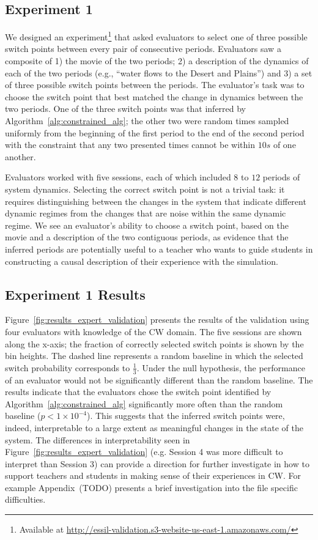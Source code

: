 \subsection{Experiment 1}\label{sec:experiment1-empirical-validation}

We designed an experiment\footnote{Available at \url{http://essil-validation.s3-website-us-east-1.amazonaws.com/}} that asked evaluators to select one of three possible switch points between every pair of consecutive periods. Evaluators saw a composite of 1) the movie of the two periods; 2) a description of the dynamics of each of the two periods (e.g., ``water flows to the Desert and Plains'') and 3) a set of three possible switch points between the periods. The evaluator's task was to choose the switch point that best matched the change in dynamics between the two periods. One of the three switch points was that inferred by Algorithm~\ref{alg:constrained_alg}; the other two were random times sampled uniformly from the beginning of the first period to the end of the second period with the constraint that any two presented times cannot be within $10s$ of one another.

Evaluators worked with five sessions, each of which included $8$ to $12$ periods of system dynamics. Selecting the correct switch point is not a trivial task: it requires distinguishing between the changes in the system that indicate different dynamic regimes from the changes that are noise within the same dynamic regime. We see an evaluator's ability to choose a switch point, based on the movie and a description of the two contiguous periods, as evidence that the inferred periods are potentially useful to a teacher who wants to guide students in constructing a causal description of their experience with the simulation.

\subsection{Experiment 1 Results}\label{sec:experiment1-empirical-validation-results}

Figure~\ref{fig:results_expert_validation} presents the results of the validation using four evaluators with knowledge of the CW domain. The five sessions are shown along the x-axis; the fraction of correctly selected switch points is shown by the bin heights. The dashed line represents a random baseline in which the selected switch probability corresponds to $\frac{1}{3}$. Under the null hypothesis, the performance of an evaluator would not be significantly different than the random baseline. The results indicate that the evaluators chose the switch point identified by Algorithm~\ref{alg:constrained_alg} significantly more often than the random baseline ($p < 1\times 10^{-4}$). This suggests that the inferred switch points were, indeed, interpretable to a large extent as meaningful changes in the state of the system. The differences in interpretability seen in Figure~\ref{fig:results_expert_validation} (e.g. Session 4 was more difficult to interpret than Session 3) can provide a direction for further investigate in how to support teachers and students in making sense of their experiences in CW. For example Appendix~(TODO) presents a brief investigation into the file specific difficulties.

